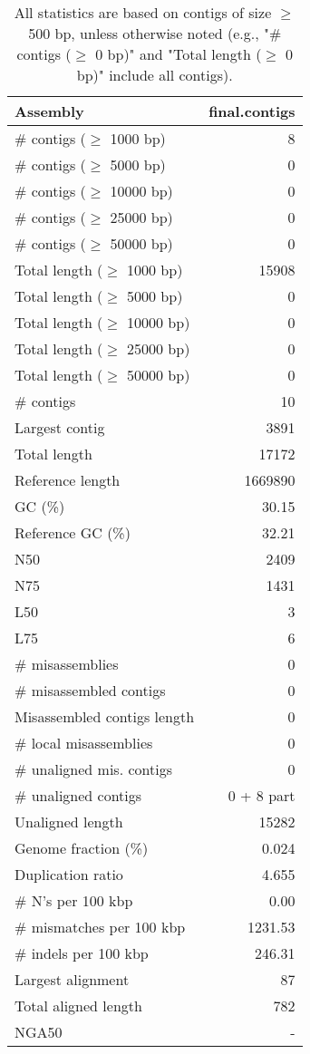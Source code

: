 \documentclass[12pt,a4paper]{article}
\begin{document}
\begin{table}[ht]
\begin{center}
\caption{All statistics are based on contigs of size $\geq$ 500 bp, unless otherwise noted (e.g., "\# contigs ($\geq$ 0 bp)" and "Total length ($\geq$ 0 bp)" include all contigs).}
\begin{tabular}{|l*{1}{|r}|}
\hline
Assembly & final.contigs \\ \hline
\# contigs ($\geq$ 1000 bp) & 8 \\ \hline
\# contigs ($\geq$ 5000 bp) & 0 \\ \hline
\# contigs ($\geq$ 10000 bp) & 0 \\ \hline
\# contigs ($\geq$ 25000 bp) & 0 \\ \hline
\# contigs ($\geq$ 50000 bp) & 0 \\ \hline
Total length ($\geq$ 1000 bp) & 15908 \\ \hline
Total length ($\geq$ 5000 bp) & 0 \\ \hline
Total length ($\geq$ 10000 bp) & 0 \\ \hline
Total length ($\geq$ 25000 bp) & 0 \\ \hline
Total length ($\geq$ 50000 bp) & 0 \\ \hline
\# contigs & 10 \\ \hline
Largest contig & 3891 \\ \hline
Total length & 17172 \\ \hline
Reference length & 1669890 \\ \hline
GC (\%) & 30.15 \\ \hline
Reference GC (\%) & 32.21 \\ \hline
N50 & 2409 \\ \hline
N75 & 1431 \\ \hline
L50 & 3 \\ \hline
L75 & 6 \\ \hline
\# misassemblies & 0 \\ \hline
\# misassembled contigs & 0 \\ \hline
Misassembled contigs length & 0 \\ \hline
\# local misassemblies & 0 \\ \hline
\# unaligned mis. contigs & 0 \\ \hline
\# unaligned contigs & 0 + 8 part \\ \hline
Unaligned length & 15282 \\ \hline
Genome fraction (\%) & 0.024 \\ \hline
Duplication ratio & 4.655 \\ \hline
\# N's per 100 kbp & 0.00 \\ \hline
\# mismatches per 100 kbp & 1231.53 \\ \hline
\# indels per 100 kbp & 246.31 \\ \hline
Largest alignment & 87 \\ \hline
Total aligned length & 782 \\ \hline
NGA50 & - \\ \hline
\end{tabular}
\end{center}
\end{table}
\end{document}
